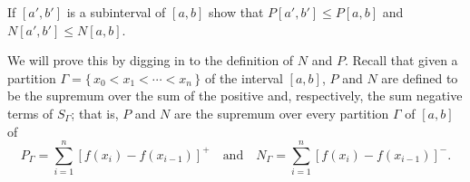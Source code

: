 \begin{problem}
  If $[a',b']$ is a subinterval of $[a,b]$ show that $P[a',b']\leq P[a,b]$
  and $N[a',b']\leq N[a,b]$.
\end{problem}
\begin{solution}
  We will prove this by digging in to the definition of $N$ and $P$.
  Recall that given a partition $\Gamma=\{\,x_0<x_1<\cdots<x_n\,\}$ of the
  interval $[a,b]$, $P$ and $N$ are defined to be the supremum over the sum
  of the positive and, respectively, the sum negative terms of $S_\Gamma$;
  that is, $P$ and $N$ are the supremum over every partition $\Gamma$ of
  $[a,b]$ of
  \[
    P_\Gamma=\sum_{i=1}^n\left[f(x_i)-f(x_{i-1})\right]^+
    \quad\text{and}\quad
    N_\Gamma=\sum_{i=1}^n\left[f(x_i)-f(x_{i-1})\right]^-.
  \]


\end{solution}
